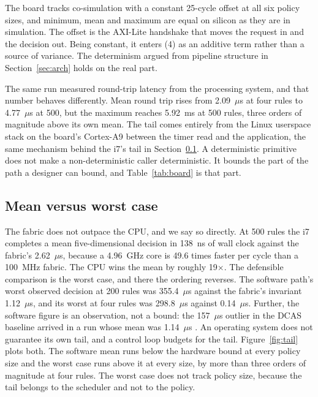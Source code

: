 \documentclass[conference]{IEEEtran}
\newcommand{\new}[1]{\textcolor{hkred}{#1}}
\begin{document}
\new{The board tracks co-simulation with a constant 25-cycle offset at all six policy sizes, and minimum, mean and maximum are equal on silicon as they are in simulation. The offset is the AXI-Lite handshake that moves the request in and the decision out. Being constant, it enters (4) as an additive term rather than a source of variance. The determinism argued from pipeline structure in Section~\ref{sec:arch} holds on the real part.}

\new{The same run measured round-trip latency from the processing system, and that number behaves differently. Mean round trip rises from 2.09~$\mu$s at four rules to 4.77~$\mu$s at 500, but the maximum reaches 5.92~ms at 500 rules, three orders of magnitude above its own mean. The tail comes entirely from the Linux userspace stack on the board's Cortex-A9 between the timer read and the application, the same mechanism behind the i7's tail in Section~\ref{subsec:comparison}. A deterministic primitive does not make a non-deterministic caller deterministic. It bounds the part of the path a designer can bound, and Table~\ref{tab:board} is that part.}

\subsection{Mean versus worst case}
\label{subsec:comparison}

The fabric does not outpace the CPU, and we say so directly. At 500 rules the i7 completes a mean five-dimensional decision in 138~ns of wall clock against the fabric's 2.62~$\mu$s, because a 4.96~GHz core is 49.6 times faster per cycle than a 100~MHz fabric. The CPU wins the mean by roughly 19$\times$. The defensible comparison is the worst case, and there the ordering reverses. The software path's worst observed decision at 200 rules was 355.4~$\mu$s against the fabric's invariant 1.12~$\mu$s, and its worst at four rules was 298.8~$\mu$s against 0.14~$\mu$s. Further, the software figure is an observation, not a bound: the 157~$\mu$s outlier in the DCAS baseline arrived in a run whose mean was 1.14~$\mu$s \cite{karim2026dcas}. An operating system does not guarantee its own tail, and a control loop budgets for the tail. Figure~\ref{fig:tail} plots both. The software mean runs below the hardware bound at every policy size and the worst case runs above it at every size, by more than three orders of magnitude at four rules. The worst case does not track policy size, because the tail belongs to the scheduler and not to the policy.
\end{document}
